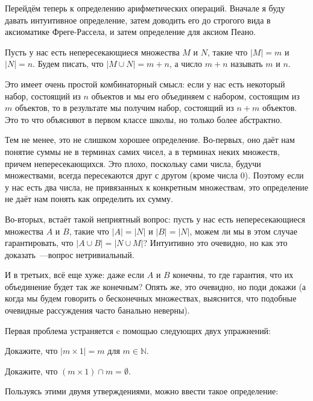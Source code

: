 Перейдём теперь к определению арифметических операций. Вначале я буду давать интуитивное определение, затем доводить его до строгого вида в аксиоматике Фреге-Рассела, и затем определение для аксиом Пеано.

\begin{definition}
Пусть у нас есть непересекающиеся множества $M$ и $N$, такие что $|M|=m$ и $|N| = n$. Будем писать, что $|M\cup N| = m+n$, а число $m+n$ называть  $m$ и $n$.
\end{definition}

Это имеет очень простой комбинаторный смысл: если у нас есть некоторый набор, состоящий из $n$ объектов и мы его объединяем с набором, состоящим из $m$ объектов, то в результате мы получим набор, состоящий из $n+m$ объектов. Это то что объясняют в первом классе школы, но только более абстрактно.

Тем не менее, это не слишком хорошее определение. Во-первых, оно даёт нам понятие суммы не в терминах самих чисел, а в терминах неких множеств, причем непересекающихся. Это плохо, поскольку сами числа, будучи множествами, всегда пересекаются друг с другом (кроме числа 0). Поэтому если у нас есть два числа, не привязанных к конкретным множествам, это определение не даёт нам понять как определить их сумму.

Во-вторых, встаёт такой неприятный вопрос: пусть у нас есть непересекающиеся множества $A$ и $B$, такие что $|A|=|N|$ и $|B|=|N|$, можем ли мы в этом случае гарантировать, что $|A\cup B| = |N\cup M|$? Интуитивно это очевидно, но как это доказать~---вопрос нетривиальный.

И в третьих, всё еще хуже: даже если $A$ и $B$ конечны, то где гарантия, что их объединение будет так же конечным? Опять же, это очевидно, но поди докажи (а когда мы будем говорить о бесконечных множествах, выяснится, что подобные очевидные рассуждения часто банально неверны).

Первая проблема устраняется c помощью следующих двух упражнений:

\begin{exercise}
Докажите, что $|m\times 1| = m$ для $m\in\mathbb{N}$.
\end{exercise}

\begin{exercise}
Докажите, что $(m\times 1) \cap m = \emptyset$.
\end{exercise}

Пользуясь этими двумя утверждениями, можно ввести такое определение:

